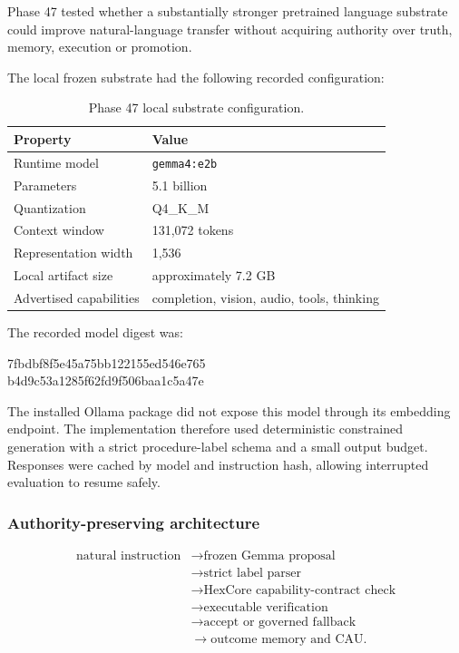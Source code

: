 Phase 47 tested whether a substantially stronger pretrained language
substrate could improve natural-language transfer without acquiring authority
over truth, memory, execution or promotion.

The local frozen substrate had the following recorded configuration:
\begin{table}[htbp]
\centering
\begin{tabular}{ll}
\hline
\textbf{Property} & \textbf{Value}\\
\hline
Runtime model & \texttt{gemma4:e2b}\\
Parameters & 5.1 billion\\
Quantization & Q4\_K\_M\\
Context window & 131,072 tokens\\
Representation width & 1,536\\
Local artifact size & approximately 7.2 GB\\
Advertised capabilities & completion, vision, audio, tools, thinking\\
\hline
\end{tabular}
\caption{Phase 47 local substrate configuration.}
\label{tab:phase47-substrate}
\end{table}

The recorded model digest was:
\begin{center}
\small\ttfamily
7fbdbf8f5e45a75bb122155ed546e765\\
b4d9c53a1285f62fd9f506baa1c5a47e
\end{center}
The installed Ollama package did not expose this model through its embedding
endpoint.  The implementation therefore used deterministic constrained
generation with a strict procedure-label schema and a small output budget.
Responses were cached by model and instruction hash, allowing interrupted
evaluation to resume safely.

\subsubsection{Authority-preserving architecture}

\[
\begin{aligned}
\text{natural instruction}
&\rightarrow \text{frozen Gemma proposal}\\
&\rightarrow \text{strict label parser}\\
&\rightarrow \text{HexCore capability-contract check}\\
&\rightarrow \text{executable verification}\\
&\rightarrow \text{accept or governed fallback}\\
&\rightarrow \text{outcome memory and CAU}.
\end{aligned}
\]

